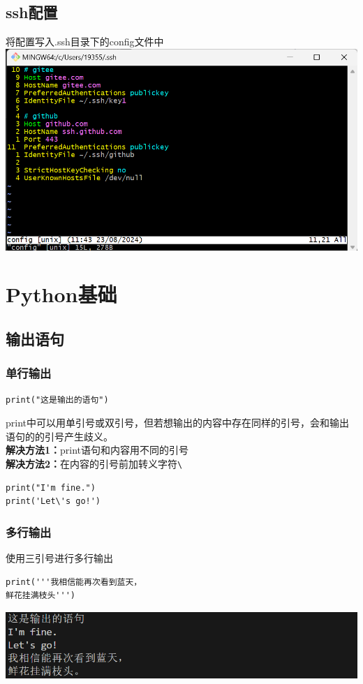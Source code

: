 \documentclass[UTF8,a4paper]{ctexart}
\begin{document}
\subsection{ssh配置}
将配置写入.ssh目录下的config文件中\\
\includegraphics[width=1\textwidth]{./命令行/ssh2.png}

\section{Python基础}
\setcounter{page}{1} %
\subsection{输出语句}
\subsubsection{单行输出}
\begin{lstlisting}
print("这是输出的语句")
\end{lstlisting}
print中可以用单引号或双引号，但若想输出的内容中存在同样的引号，会和输出语句的的引号产生歧义。\\
\textbf{解决方法1：}print语句和内容用不同的引号\\
\textbf{解决方法2：}在内容的引号前加转义字符\verb|\|
\begin{lstlisting}
print("I'm fine.")
print('Let\'s go!')
\end{lstlisting}
\subsubsection{多行输出}
使用三引号进行多行输出
\begin{lstlisting}
print('''我相信能再次看到蓝天，
鲜花挂满枝头''')
\end{lstlisting}
\includegraphics[width=1\textwidth]{./python/print1.png}
\end{document}
